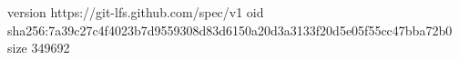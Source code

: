version https://git-lfs.github.com/spec/v1
oid sha256:7a39c27c4f4023b7d9559308d83d6150a20d3a3133f20d5e05f55cc47bba72b0
size 349692
